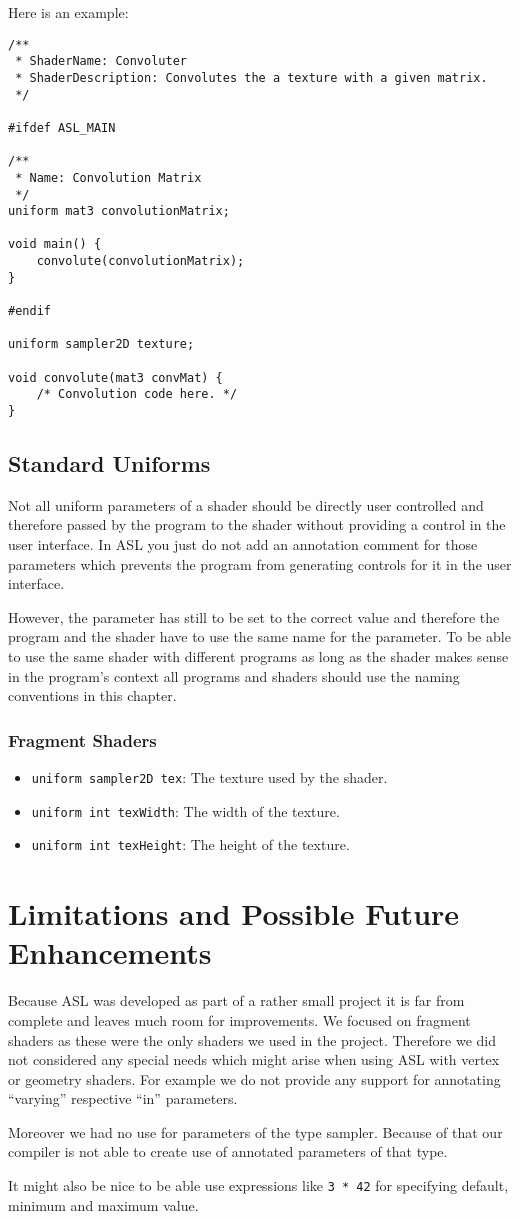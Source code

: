 \documentclass[11pt,a4paper]{scrreprt}
\begin{document}
Here is an example:
\begin{lstlisting}
/**
 * ShaderName: Convoluter
 * ShaderDescription: Convolutes the a texture with a given matrix.
 */

#ifdef ASL_MAIN

/**
 * Name: Convolution Matrix
 */
uniform mat3 convolutionMatrix;

void main() {
    convolute(convolutionMatrix);
}

#endif

uniform sampler2D texture;

void convolute(mat3 convMat) {
    /* Convolution code here. */
}
\end{lstlisting}

\section{Standard Uniforms}
Not all uniform parameters of a shader should be directly user controlled and 
therefore passed by the program to the shader without providing a control in the 
user interface. In ASL you just do not add an annotation comment for those 
parameters which prevents the program from generating controls for it in the 
user interface.

However, the parameter has still to be set to the correct value and therefore 
the program and the shader have to use the same name for the parameter. To be 
able to use the same shader with different programs as long as the shader makes 
sense in the program's context all programs and shaders should use the naming 
conventions in this chapter.

\subsection{Fragment Shaders}
\begin{itemize}
    \item \lstinline$uniform sampler2D tex$: The texture used by the shader.
    \item \lstinline$uniform int texWidth$: The width of the texture.
    \item \lstinline$uniform int texHeight$: The height of the texture.
\end{itemize}

\appendix
\chapter{Limitations and Possible Future Enhancements}
Because ASL was developed as part of a rather small project it is far from 
complete and leaves much room for improvements. We focused on fragment shaders 
as these were the only shaders we used in the project. Therefore we did not 
considered any special needs which might arise when using ASL with vertex or 
geometry shaders. For example we do not provide any support for annotating 
``varying'' respective ``in'' parameters.

Moreover we had no use for parameters of the type sampler. Because of that our 
compiler is not able to create use of annotated parameters of that type.

It might also be nice to be able use expressions like \lstinline$3 * 42$ for 
specifying default, minimum and maximum value.
\end{document}
